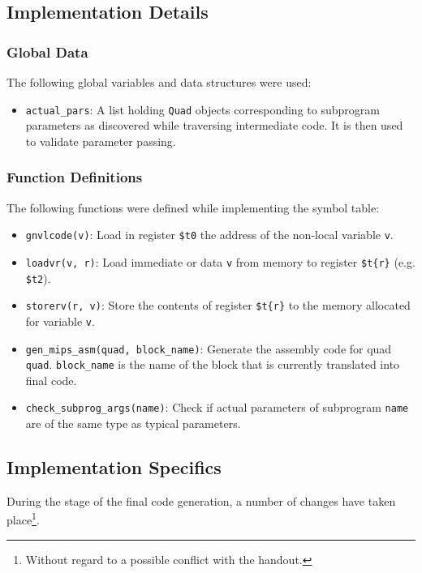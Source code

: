 \documentclass{article}
\def\code#1{\texttt{#1}} %
\begin{document}
\subsection{Implementation Details}

\subsubsection{Global Data}
The following global variables and data structures were used:
\begin{itemize}
 \item \code{actual\_pars}: A list holding \code{Quad} objects corresponding to subprogram parameters
                            as discovered while traversing intermediate code. It is then used to validate
                            parameter passing.
\end{itemize}

\subsubsection{Function Definitions}
The following functions were defined while implementing the symbol table:
\begin{itemize}
 \item \code{gnvlcode(v)}: Load in register \code{\$t0} the address of the non-local variable \code{v}.
 \item \code{loadvr(v, r)}: Load immediate or data \code{v} from memory to register \code{\$t\{r\}} (e.g. \code{\$t2}).
 \item \code{storerv(r, v)}: Store the contents of register \code{\$t\{r\}} to the memory allocated
                             for variable \code{v}.
 \item \code{gen\_mips\_asm(quad, block\_name)}: Generate the assembly code for quad \code{quad}.
                                              \code{block\_name} is the name of the block that is
                                              currently translated into final code.
 \item \code{check\_subprog\_args(name)}: Check if actual parameters of subprogram \code{name}
                                          are of the same type as typical parameters.
                                          
\end{itemize}

\subsection{Implementation Specifics}
During the stage of the final code generation, a number of changes have taken
place\footnote{Without regard to a possible conflict with the handout.}.
\end{document}
